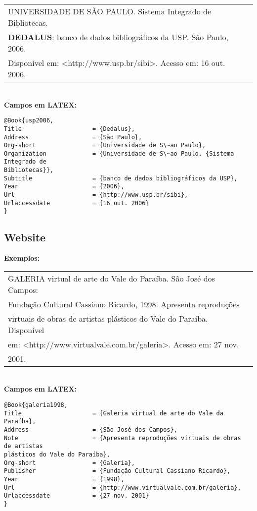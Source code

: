 \begin{tabular}{|l|c|} \hline
	UNIVERSIDADE DE SÃO PAULO. Sistema Integrado de Bibliotecas. \\\textbf{DEDALUS}: banco de dados bibliográficos da USP. São Paulo, 2006. \\Disponível em: <http://www.usp.br/sibi>. Acesso em: 16 out. 2006. 
	                                                              \\\hline
\end{tabular} \\
	
\textbf{Campos em LATEX:} 
	
\begingroup
\fontsize{10pt}{12pt}\selectfont
\begin{verbatim}
@Book{usp2006,
Title                    = {Dedalus},
Address                  = {São Paulo},
Org-short                = {Universidade de S\~ao Paulo},
Organization             = {Universidade de S\~ao Paulo. {Sistema 
Integrado de 
Bibliotecas}},
Subtitle                 = {banco de dados bibliográficos da USP},
Year                     = {2006},
Url                      = {http://www.usp.br/sibi},
Urlaccessdate            = {16 out. 2006}
}
\end{verbatim}
\endgroup
	
\subsection{Website}
	
\textbf{Exemplos:} \\
	
\begin{tabular}{|l|c|} \hline
	GALERIA virtual de arte do Vale do Paraíba. São José dos Campos: \\Fundação Cultural Cassiano Ricardo, 1998. Apresenta reproduções \\virtuais de obras de artistas plásticos do Vale do Paraíba. Disponível \\em: <http://www.virtualvale.com.br/galeria>. Acesso em: 27 nov. \\2001. 
	                                                                    \\\hline
\end{tabular} \\
	
\textbf{Campos em LATEX:} 
	
\begingroup
\fontsize{10pt}{12pt}\selectfont
\begin{verbatim}
@Book{galeria1998,
Title                    = {Galeria virtual de arte do Vale da 
Paraíba},
Address                  = {São José dos Campos},
Note                     = {Apresenta reproduções virtuais de obras
de artistas 
plásticos do Vale do Paraíba},
Org-short                = {Galeria},
Publisher                = {Fundação Cultural Cassiano Ricardo},
Year                     = {1998},
Url                      = {http://www.virtualvale.com.br/galeria},
Urlaccessdate            = {27 nov. 2001}
}

\end{verbatim}
\endgroup
